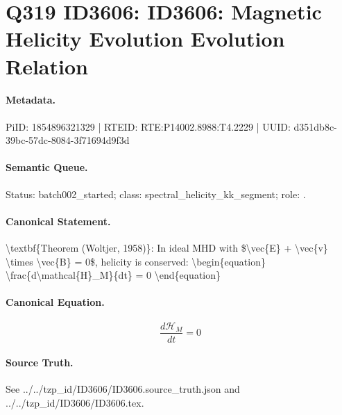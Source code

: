 \section*{Q319 ID3606: ID3606: Magnetic Helicity Evolution Evolution Relation}
\paragraph{Metadata.}
PiID: 1854896321329 | RTEID: RTE:P14002.8988:T4.2229 | UUID: d351db8c-39bc-57dc-8084-3f71694d9f3d

\paragraph{Semantic Queue.}
Status: batch002\_started; class: spectral\_helicity\_kk\_segment; role: .

\paragraph{Canonical Statement.}
\textbackslash{}textbf\{Theorem (Woltjer, 1958)\}: In ideal MHD with \$\textbackslash{}vec\{E\} + \textbackslash{}vec\{v\} \textbackslash{}times \textbackslash{}vec\{B\} = 0\$, helicity is conserved: \textbackslash{}begin\{equation\} \textbackslash{}frac\{d\textbackslash{}mathcal\{H\}\_M\}\{dt\} = 0 \textbackslash{}end\{equation\}

\paragraph{Canonical Equation.}
\[
\begin{equation} \frac{d\mathcal{H}_M}{dt} = 0 \end{equation}
\]

\paragraph{Source Truth.}
See ../../tzp\_id/ID3606/ID3606.source\_truth.json and ../../tzp\_id/ID3606/ID3606.tex.
